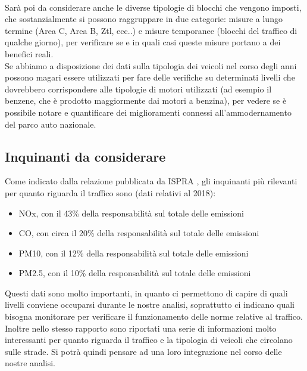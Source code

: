 \documentclass{article}
\begin{document}
\\Sarà poi da considerare anche le diverse tipologie di blocchi che vengono imposti, che sostanzialmente si possono raggruppare in due categorie: misure a lungo termine (Area C, Area B, Ztl, ecc..) e misure temporanee (blocchi del traffico di qualche giorno), per verificare se e in quali casi queste misure portano a dei benefici reali.
\\Se abbiamo a disposizione dei dati sulla tipologia dei veicoli nel corso degli anni possono magari essere utilizzati per fare delle verifiche su determinati livelli che dovrebbero corrispondere alle tipologie di motori utilizzati (ad esempio il benzene, che è prodotto maggiormente dai motori a benzina), per vedere se è possibile notare e quantificare dei miglioramenti connessi all'ammodernamento del parco auto nazionale.

\subsection{Inquinanti da considerare}
Come indicato dalla relazione pubblicata da ISPRA \cite{iir2020}, gli inquinanti più rilevanti per quanto riguarda il traffico sono (dati relativi al 2018): 
\begin{itemize}
	\item NOx, con il 43\% della responsabilità sul totale delle emissioni
	\item CO, con circa il 20\% della responsabilità sul totale delle emissioni
	\item PM10, con il 12\% della responsabilità sul totale delle emissioni
	\item PM2.5, con il 10\% della responsabilità sul totale delle emissioni
\end{itemize}
Questi dati sono molto importanti, in quanto ci permettono di capire di quali livelli conviene occuparsi durante le nostre analisi, soprattutto ci indicano quali bisogna monitorare per verificare il funzionamento delle norme relative al traffico. 
\\Inoltre nello stesso rapporto sono riportati una serie di informazioni molto interessanti per quanto riguarda il traffico e la tipologia di veicoli che circolano sulle strade. Si potrà quindi pensare ad una loro integrazione nel corso delle nostre analisi.
\newpage
\end{document}
